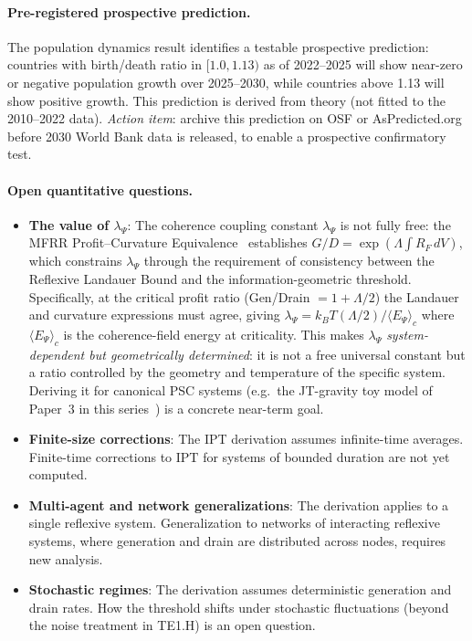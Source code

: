 \documentclass[11pt,twocolumn]{article}
\theoremstyle{remark}
\begin{document}
\paragraph{Pre-registered prospective prediction.}
The population dynamics result identifies a testable prospective prediction: countries with birth/death ratio in $[1.0, 1.13)$ as of 2022--2025 will show near-zero or negative population growth over 2025--2030, while countries above 1.13 will show positive growth. This prediction is derived from theory (not fitted to the 2010--2022 data). \textit{Action item}: archive this prediction on OSF or AsPredicted.org before 2030 World Bank data is released, to enable a prospective confirmatory test.

\paragraph{Open quantitative questions.}
\begin{itemize}
  \item \textbf{The value of $\lambda_\Psi$}: The coherence coupling
    constant $\lambda_\Psi$ is not fully free: the MFRR Profit--Curvature
    Equivalence~\cite{SpivackNEMSMFRRBridge} establishes
    $G/D = \exp(\Lambda \!\int\! R_F\,dV)$, which constrains $\lambda_\Psi$
    through the requirement of consistency between the Reflexive Landauer Bound
    and the information-geometric threshold. Specifically, at the critical profit
    ratio (Gen/Drain $= 1+\Lambda/2$) the Landauer and curvature expressions
    must agree, giving $\lambda_\Psi = k_BT(\Lambda/2)/\langle E_\Psi\rangle_c$
    where $\langle E_\Psi\rangle_c$ is the coherence-field energy at criticality.
    This makes $\lambda_\Psi$ \emph{system-dependent but geometrically
    determined}: it is not a free universal constant but a ratio controlled
    by the geometry and temperature of the specific system. Deriving it for
    canonical PSC systems (e.g.\ the JT-gravity toy model of Paper~3 in this
    series~\cite{SpivackBHUnitarity}) is a concrete near-term goal.

  \item \textbf{Finite-size corrections}: The IPT derivation assumes
    infinite-time averages. Finite-time corrections to $\mathrm{IPT}$
    for systems of bounded duration are not yet computed.

  \item \textbf{Multi-agent and network generalizations}: The
    derivation applies to a single reflexive system. Generalization to
    networks of interacting reflexive systems, where generation and
    drain are distributed across nodes, requires new analysis.

  \item \textbf{Stochastic regimes}: The derivation assumes
    deterministic generation and drain rates. How the threshold
    shifts under stochastic fluctuations (beyond the noise
    treatment in TE1.H) is an open question.
\end{itemize}
\end{document}
